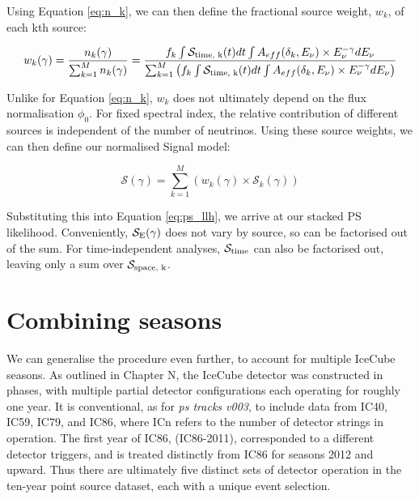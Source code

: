 Using Equation \ref{eq:n_k}, we can then define the fractional source weight, $w_{k}$, of each kth source:

\begin{equation}
w_{k}(\gamma)  = \frac{n_{k}(\gamma) }{\sum^{M}_{k=1} n_{k}(\gamma) } = \frac{f_{k} \int \mathcal{S}_{\textup{time, k}}(t) dt \int A_{eff}(\delta_{k}, E_{\nu}) \times E_{\nu}^{-\gamma} dE_{\nu}}{\sum^{M}_{k=1} \left( f_{k} \int \mathcal{S}_{\textup{time, k}}(t) dt \int A_{eff}(\delta_{k}, E_{\nu}) \times E_{\nu}^{-\gamma} dE_{\nu} \right)}
\end{equation}

Unlike for Equation \ref{eq:n_k}, $w_{k}$ does not ultimately depend on the flux normalisation $\phi_{0}$. For fixed spectral index, the relative contribution of different sources is independent of the number of neutrinos. Using these source weights, we can then define our normalised Signal model:

\begin{equation}
\mathcal{S}(\gamma) = \sum^{M}_{k=1} \left( w_{k}(\gamma)  \times \mathcal{S}_{k}(\gamma)  \right)
\label{eq:S_stacked}
\end{equation}

Substituting this into Equation \ref{eq:ps_llh}, we arrive at our stacked PS likelihood. Conveniently, $\mathcal{S}_{\textup{E}}(\gamma)$ does not vary by source, so can be factorised out of the sum. For time-independent analyses, $\mathcal{S}_{\textup{time}}$ can also be factorised out, leaving only a sum over $\mathcal{S}_{\textup{space, k}}$.

\section{Combining seasons}

We can generalise the procedure even further, to account for multiple IceCube seasons. As outlined in Chapter N, the IceCube detector was constructed in phases, with multiple partial detector configurations each operating for roughly one year. It is conventional, as for \emph{ps tracks v003}, to include data from IC40, IC59, IC79, and IC86, where ICn refers to the number of detector strings in operation. The first year of IC86, (IC86-2011), corresponded to a different detector triggers, and is treated distinctly from IC86 for seasons 2012 and upward. Thus there are ultimately five distinct sets of detector operation in the ten-year point source dataset, each with a unique event selection.

